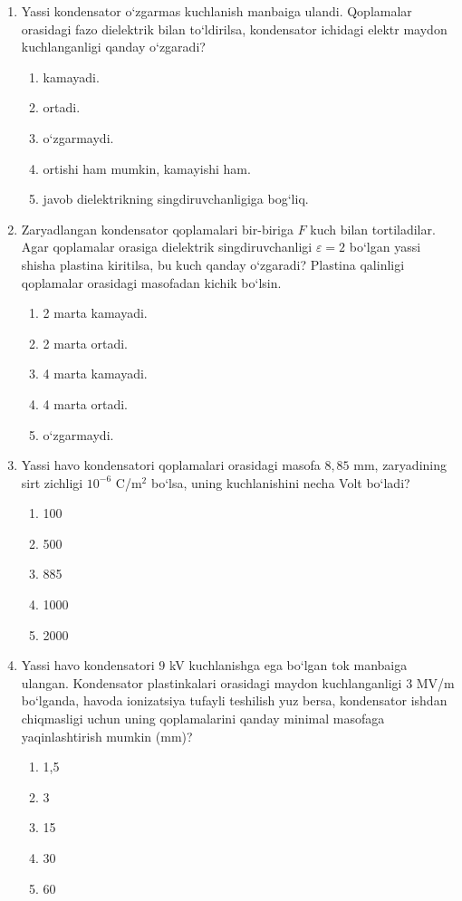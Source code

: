 \begin{enumerate}
\item Yassi kondensator o‘zgarmas kuchlanish manbaiga ulandi. Qoplamalar orasidagi fazo dielektrik bilan to‘ldirilsa, kondensator ichidagi elektr maydon kuchlanganligi qanday o‘zgaradi?
\begin{enumerate}[label=\Alph*)]
\item kamayadi.
\item ortadi.
\item o‘zgarmaydi.
\item ortishi ham mumkin, kamayishi ham.
\item javob dielektrikning singdiruvchanligiga bog‘liq.
\end{enumerate}

\item Zaryadlangan kondensator qoplamalari bir-biriga $F$ kuch bilan tortiladilar. Agar qoplamalar orasiga dielektrik singdiruvchanligi $\varepsilon=2$ bo‘lgan yassi shisha plastina kiritilsa, bu kuch qanday o‘zgaradi? Plastina qalinligi qoplamalar orasidagi masofadan kichik bo‘lsin.
\begin{enumerate}[label=\Alph*)]
\item 2 marta kamayadi.
\item 2 marta ortadi.
\item 4 marta kamayadi.
\item 4 marta ortadi.
\item o‘zgarmaydi.
\end{enumerate}

\item Yassi havo kondensatori qoplamalari orasidagi masofa $8,85$ mm, zaryadining sirt zichligi $10^{-6}$ C/m$^2$ bo‘lsa, uning kuchlanishini necha Volt bo‘ladi?
\begin{enumerate}[label=\Alph*)]
\item 100
\item 500
\item 885
\item 1000
\item 2000
\end{enumerate}

\item Yassi havo kondensatori $9$ kV kuchlanishga ega bo‘lgan tok manbaiga ulangan. Kondensator plastinkalari orasidagi maydon kuchlanganligi $3$ MV/m bo‘lganda, havoda ionizatsiya tufayli teshilish yuz bersa, kondensator ishdan chiqmasligi uchun uning qoplamalarini qanday minimal masofaga yaqinlashtirish mumkin (mm)?
\begin{enumerate}[label=\Alph*)]
\item 1,5
\item 3
\item 15
\item 30
\item 60
\end{enumerate}


\end{enumerate}
